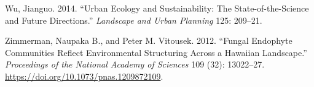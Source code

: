 \documentclass[fleqn,10pt,lineno]{wlpeerj} %
\newlength{\cslhangindent}
\newenvironment{CSLReferences}[2] %
 {%
  \setlength{\parindent}{0pt}
  \ifodd #1 \everypar{\setlength{\hangindent}{\cslhangindent}}\ignorespaces\fi
  \ifnum #2 > 0
  \setlength{\parskip}{#2\baselineskip}
  \fi
 }%
 {}
\begin{document}
\begin{CSLReferences}{1}{0}
\leavevmode{}%
Wu, Jianguo. 2014. {``Urban Ecology and Sustainability: The State-of-the-Science and Future Directions.''} \emph{Landscape and Urban Planning} 125: 209--21.

\leavevmode{}%
Zimmerman, Naupaka B., and Peter M. Vitousek. 2012. {``Fungal Endophyte Communities Reflect Environmental Structuring Across a Hawaiian Landscape.''} \emph{Proceedings of the National Academy of Sciences} 109 (32): 13022--27. \url{https://doi.org/10.1073/pnas.1209872109}.

\end{CSLReferences}
\end{document}
